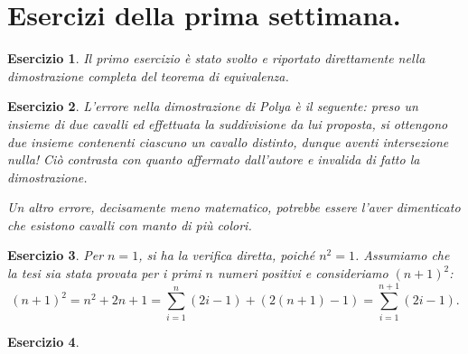\documentclass[fontsize = 11 pt, paper=A4, oneside, index=totoc, hyperref]{book}
\theoremstyle{definition}
\theoremstyle{plain}
\newtheorem{exe}{Esercizio}[section]
\begin{document}
\section{Esercizi della prima settimana.}
\begin{exe}
  Il primo esercizio è stato svolto e riportato direttamente nella dimostrazione completa del teorema di equivalenza.
\end{exe}
\begin{exe}
  L'errore nella dimostrazione di Polya è il seguente: preso un insieme di due cavalli ed effettuata la suddivisione da lui proposta, si ottengono due insieme contenenti ciascuno un cavallo distinto, dunque aventi intersezione nulla! Ciò contrasta con quanto affermato dall'autore e invalida di fatto la dimostrazione.

  Un altro errore, decisamente meno matematico, potrebbe essere l'aver dimenticato che esistono cavalli con manto di più colori.
\end{exe}
\begin{exe}
  Per \(n = 1\), si ha la verifica diretta, poiché \(n^2 = 1\). Assumiamo che la tesi sia stata provata per i primi \(n\) numeri positivi e consideriamo \((n+1)^2\):
  \begin{equation}
    (n+1)^2 = n^2 + 2n + 1 = \sum_{i=1}^n (2i - 1) + (2(n + 1) - 1) = \sum_{i = 1}^{n+1}(2i - 1).
  \end{equation}
\end{exe}
\begin{exe}
\end{exe}
\end{document}
